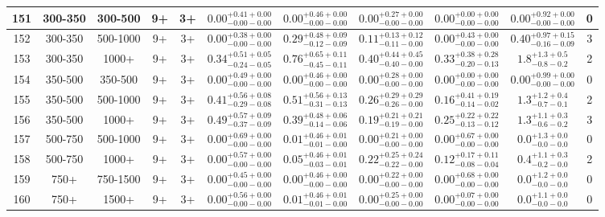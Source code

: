 \documentclass[11pt, oneside]{article}
\begin{document}
\begin{table}
{\begin{tabular}{ |c|c|c|c|c||c|c|c|c||c|c| }
151 & 300-350 & 300-500 & 9+ & 3+ & $0.00^{+0.41+0.00}_{-0.00-0.00}$ & $0.00^{+0.46+0.00}_{-0.00-0.00}$ & $0.00^{+0.27+0.00}_{-0.00-0.00}$ & $0.00^{+0.00+0.00}_{-0.00-0.00}$ & $0.00^{+0.92+0.00}_{-0.00-0.00}$ & 0 \\ \hline
152 & 300-350 & 500-1000 & 9+ & 3+ & $0.00^{+0.38+0.00}_{-0.00-0.00}$ & $0.29^{+0.48+0.09}_{-0.12-0.09}$ & $0.11^{+0.13+0.12}_{-0.11-0.00}$ & $0.00^{+0.43+0.00}_{-0.00-0.00}$ & $0.40^{+0.97+0.15}_{-0.16-0.09}$ & 3 \\ \hline
153 & 300-350 & 1000+ & 9+ & 3+ & $0.34^{+0.51+0.05}_{-0.24-0.05}$ & $0.76^{+0.65+0.11}_{-0.45-0.11}$ & $0.40^{+0.44+0.45}_{-0.40-0.00}$ & $0.33^{+0.38+0.28}_{-0.20-0.13}$ & $1.8^{+1.3+0.5}_{-0.8-0.2}$ & 2 \\ \hline
154 & 350-500 & 350-500 & 9+ & 3+ & $0.00^{+0.49+0.00}_{-0.00-0.00}$ & $0.00^{+0.46+0.00}_{-0.00-0.00}$ & $0.00^{+0.28+0.00}_{-0.00-0.00}$ & $0.00^{+0.00+0.00}_{-0.00-0.00}$ & $0.00^{+0.99+0.00}_{-0.00-0.00}$ & 0 \\ \hline
155 & 350-500 & 500-1000 & 9+ & 3+ & $0.41^{+0.56+0.08}_{-0.29-0.08}$ & $0.51^{+0.56+0.13}_{-0.31-0.13}$ & $0.26^{+0.29+0.29}_{-0.26-0.00}$ & $0.16^{+0.41+0.19}_{-0.14-0.02}$ & $1.3^{+1.2+0.4}_{-0.7-0.1}$ & 2 \\ \hline
156 & 350-500 & 1000+ & 9+ & 3+ & $0.49^{+0.57+0.09}_{-0.37-0.09}$ & $0.39^{+0.48+0.06}_{-0.14-0.06}$ & $0.19^{+0.21+0.21}_{-0.19-0.00}$ & $0.25^{+0.22+0.22}_{-0.13-0.12}$ & $1.3^{+1.1+0.3}_{-0.6-0.2}$ & 3 \\ \hline
157 & 500-750 & 500-1000 & 9+ & 3+ & $0.00^{+0.69+0.00}_{-0.00-0.00}$ & $0.01^{+0.46+0.01}_{-0.01-0.00}$ & $0.00^{+0.21+0.00}_{-0.00-0.00}$ & $0.00^{+0.67+0.00}_{-0.00-0.00}$ & $0.0^{+1.3+0.0}_{-0.0-0.0}$ & 0 \\ \hline
158 & 500-750 & 1000+ & 9+ & 3+ & $0.00^{+0.57+0.00}_{-0.00-0.00}$ & $0.05^{+0.46+0.01}_{-0.03-0.01}$ & $0.22^{+0.25+0.24}_{-0.22-0.00}$ & $0.12^{+0.17+0.11}_{-0.08-0.04}$ & $0.4^{+1.1+0.3}_{-0.2-0.0}$ & 2 \\ \hline
159 & 750+ & 750-1500 & 9+ & 3+ & $0.00^{+0.45+0.00}_{-0.00-0.00}$ & $0.00^{+0.46+0.00}_{-0.00-0.00}$ & $0.00^{+0.22+0.00}_{-0.00-0.00}$ & $0.00^{+0.68+0.00}_{-0.00-0.00}$ & $0.0^{+1.2+0.0}_{-0.0-0.0}$ & 0 \\ \hline
160 & 750+ & 1500+ & 9+ & 3+ & $0.00^{+0.56+0.00}_{-0.00-0.00}$ & $0.01^{+0.46+0.01}_{-0.01-0.00}$ & $0.00^{+0.25+0.00}_{-0.00-0.00}$ & $0.00^{+0.07+0.00}_{-0.00-0.00}$ & $0.0^{+1.1+0.0}_{-0.0-0.0}$ & 0 \\ \hline
\end{tabular}}
\end{table}
\end{document}
